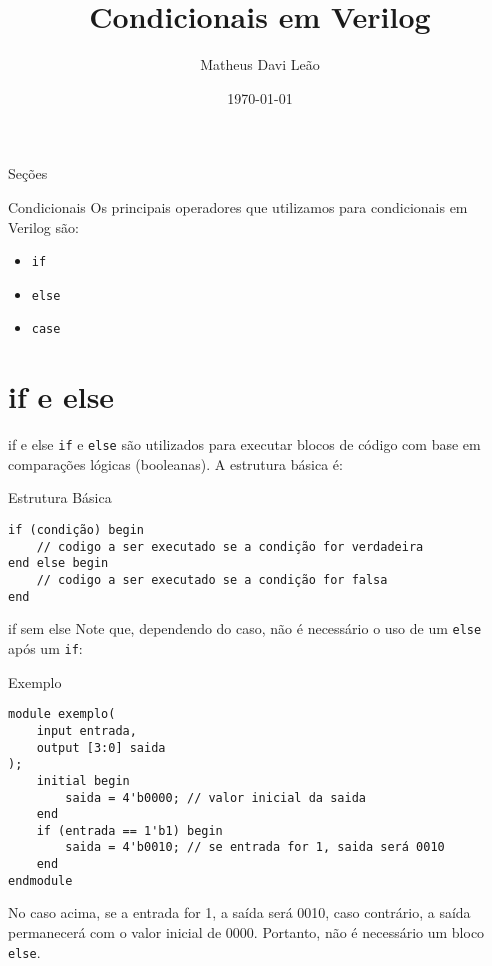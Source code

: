\documentclass[aspectratio=169,xcolor=dvipsnames]{beamer}
\title{Condicionais em Verilog}
\author{Matheus Davi Leão}
\institute
{
    Poliware \\
    Escola Politécnica da Universidade de São Paulo
}
\date{\today}
\begin{document}
\begin{frame}
    \titlepage
\end{frame}

\begin{frame}{Seções}
    \tableofcontents
\end{frame}
\begin{frame}{Condicionais}
Os principais operadores que utilizamos para condicionais em Verilog são:

\begin{itemize}
  \item \texttt{if} 
  \item \texttt{else}
  \item \texttt{case}
\end{itemize}
\end{frame}

\section{if e else}

\begin{frame}[fragile]{if e else}
\texttt{if} e \texttt{else} são utilizados para executar blocos de código com base em comparações lógicas (booleanas). A estrutura básica é:

\begin{block}{Estrutura Básica}
\begin{verbatim}
if (condição) begin
    // codigo a ser executado se a condição for verdadeira
end else begin
    // codigo a ser executado se a condição for falsa
end
\end{verbatim}
\end{block}
\end{frame}

\begin{frame}[fragile]{if sem else}
Note que, dependendo do caso, não é necessário o uso de um \texttt{else} após um \texttt{if}:

\begin{block}{Exemplo}
\begin{verbatim}
module exemplo(
    input entrada,
    output [3:0] saida 
);
    initial begin
        saida = 4'b0000; // valor inicial da saida
    end
    if (entrada == 1'b1) begin
        saida = 4'b0010; // se entrada for 1, saida será 0010
    end
endmodule
\end{verbatim}
\end{block}

No caso acima, se a entrada for 1, a saída será 0010, caso contrário, a saída permanecerá com o valor inicial de 0000. Portanto, não é necessário um bloco \texttt{else}.
\end{frame}
\end{document}
